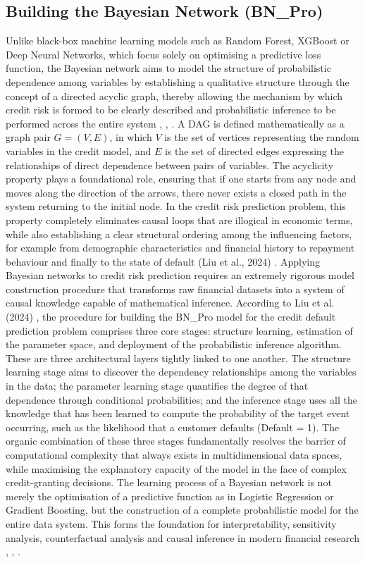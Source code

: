 \subsection{Building the Bayesian Network (BN\_Pro)}
\noindent
Unlike black-box machine learning models such as Random Forest, XGBoost or Deep Neural Networks, which focus solely on optimising a predictive loss function, the Bayesian network aims to model the structure of probabilistic dependence among variables by establishing a qualitative structure through the concept of a directed acyclic graph, thereby allowing the mechanism by which credit risk is formed to be clearly described and probabilistic inference to be performed across the entire system \cite{pearl2009causality}, \cite{koller2009probabilistic}, \cite{darwiche2009modeling}.
A DAG is defined mathematically as a graph pair $G = (V, E)$, in which $V$ is the set of vertices representing the random variables in the credit model, and $E$ is the set of directed edges expressing the relationships of direct dependence between pairs of variables. The acyclicity property plays a foundational role, ensuring that if one starts from any node and moves along the direction of the arrows, there never exists a closed path in the system returning to the initial node. In the credit risk prediction problem, this property completely eliminates causal loops that are illogical in economic terms, while also establishing a clear structural ordering among the influencing factors, for example from demographic characteristics and financial history to repayment behaviour and finally to the state of default (Liu et al., 2024) \cite{liu2024credit}.
Applying Bayesian networks to credit risk prediction requires an extremely rigorous model construction procedure that transforms raw financial datasets into a system of causal knowledge capable of mathematical inference. According to Liu et al. (2024) \cite{liu2024credit}, the procedure for building the BN\_Pro model for the credit default prediction problem comprises three core stages: structure learning, estimation of the parameter space, and deployment of the probabilistic inference algorithm. These are three architectural layers tightly linked to one another. The structure learning stage aims to discover the dependency relationships among the variables in the data; the parameter learning stage quantifies the degree of that dependence through conditional probabilities; and the inference stage uses all the knowledge that has been learned to compute the probability of the target event occurring, such as the likelihood that a customer defaults (Default = 1). The organic combination of these three stages fundamentally resolves the barrier of computational complexity that always exists in multidimensional data spaces, while maximising the explanatory capacity of the model in the face of complex credit-granting decisions.
The learning process of a Bayesian network is not merely the optimisation of a predictive function as in Logistic Regression or Gradient Boosting, but the construction of a complete probabilistic model for the entire data system. This forms the foundation for interpretability, sensitivity analysis, counterfactual analysis and causal inference in modern financial research \cite{pearl2009causality}, \cite{liu2024credit}, \cite{peters2017elements}.


